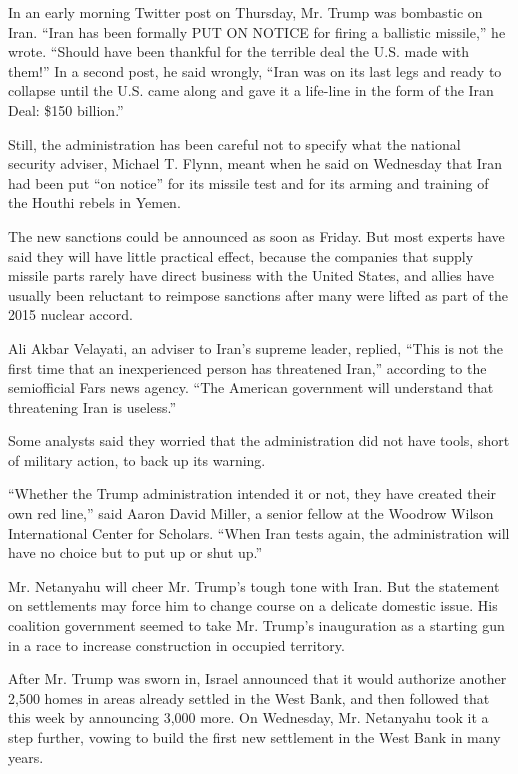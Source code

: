 In an early morning Twitter post on Thursday, Mr. Trump was bombastic on
Iran. ``Iran has been formally PUT ON NOTICE for firing a ballistic
missile,'' he wrote. ``Should have been thankful for the terrible deal
the U.S. made with them!'' In a second post, he said wrongly, ``Iran was
on its last legs and ready to collapse until the U.S. came along and
gave it a life-line in the form of the Iran Deal: \$150 billion.''

Still, the administration has been careful not to specify what the
national security adviser, Michael T. Flynn, meant when he said on
Wednesday that Iran had been put ``on notice'' for its missile test and
for its arming and training of the Houthi rebels in Yemen.

The new sanctions could be announced as soon as Friday. But most experts
have said they will have little practical effect, because the companies
that supply missile parts rarely have direct business with the United
States, and allies have usually been reluctant to reimpose sanctions
after many were lifted as part of the 2015 nuclear accord.

Ali Akbar Velayati, an adviser to Iran's supreme leader, replied, ``This
is not the first time that an inexperienced person has threatened
Iran,'' according to the semiofficial Fars news agency. ``The American
government will understand that threatening Iran is useless.''

Some analysts said they worried that the administration did not have
tools, short of military action, to back up its warning.

``Whether the Trump administration intended it or not, they have created
their own red line,'' said Aaron David Miller, a senior fellow at the
Woodrow Wilson International Center for Scholars. ``When Iran tests
again, the administration will have no choice but to put up or shut
up.''

Mr. Netanyahu will cheer Mr. Trump's tough tone with Iran. But the
statement on settlements may force him to change course on a delicate
domestic issue. His coalition government seemed to take Mr. Trump's
inauguration as a starting gun in a race to increase construction in
occupied territory.

After Mr. Trump was sworn in, Israel announced that it would authorize
another 2,500 homes in areas already settled in the West Bank, and then
followed that this week by announcing 3,000 more. On Wednesday, Mr.
Netanyahu took it a step further, vowing to build the first new
settlement in the West Bank in many years.

